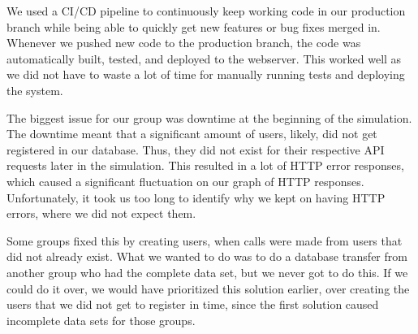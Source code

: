 We used a CI/CD pipeline to continuously keep working code in our production branch while being able to quickly get new features or bug fixes merged in. Whenever we pushed new code to the production branch, the code was automatically built, tested, and deployed to the webserver. This worked well as we did not have to waste a lot of time for manually running tests and deploying the system.

The biggest issue for our group was downtime at the beginning of the simulation. The downtime meant that a significant amount of users, likely, did not get registered in our database. Thus, they did not exist for their respective API requests later in the simulation. This resulted in a lot of HTTP error responses, which caused a significant fluctuation on our graph of HTTP responses. Unfortunately, it took us too long to identify why we kept on having HTTP errors, where we did not expect them.

Some groups fixed this by creating users, when calls were made from users that did not already exist. 
What we wanted to do was to do a database transfer from another group who had the complete data set, but we never got to do this. If we could do it over, we would have prioritized this solution earlier, over creating the users that we did not get to register in time, since the first solution caused incomplete data sets for those groups. 
